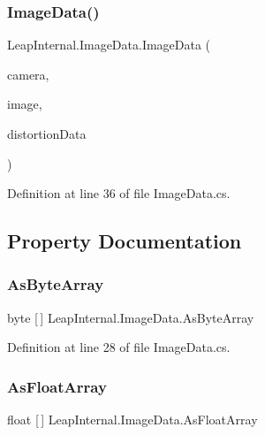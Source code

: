 \subsubsection{\texorpdfstring{ImageData()}{ImageData()}}
{\footnotesize\ttfamily Leap\+Internal.\+Image\+Data.\+Image\+Data (\begin{DoxyParamCaption}\item[{\mbox{\hyperlink{class_leap_1_1_image_a28310e43e0f2d7f7117e1b45330bdc38}{Image.\+Camera\+Type}}}]{camera,  }\item[{\mbox{\hyperlink{struct_leap_internal_1_1_l_e_a_p___i_m_a_g_e}{L\+E\+A\+P\+\_\+\+I\+M\+A\+GE}}}]{image,  }\item[{\mbox{\hyperlink{class_leap_1_1_distortion_data}{Distortion\+Data}}}]{distortion\+Data }\end{DoxyParamCaption})}



Definition at line 36 of file Image\+Data.\+cs.



\subsection{Property Documentation}
\mbox{\label{class_leap_internal_1_1_image_data_a63f037ae55493d11d3c954a8fd5fba96}} 
\subsubsection{\texorpdfstring{AsByteArray}{AsByteArray}}
{\footnotesize\ttfamily byte \mbox{[}$\,$\mbox{]} Leap\+Internal.\+Image\+Data.\+As\+Byte\+Array\hspace{0.3cm}{\ttfamily [get]}}



Definition at line 28 of file Image\+Data.\+cs.

\mbox{\label{class_leap_internal_1_1_image_data_a064d0bc313ecd08839a255a5a4a5251b}} 
\subsubsection{\texorpdfstring{AsFloatArray}{AsFloatArray}}
{\footnotesize\ttfamily float \mbox{[}$\,$\mbox{]} Leap\+Internal.\+Image\+Data.\+As\+Float\+Array\hspace{0.3cm}{\ttfamily [get]}}



